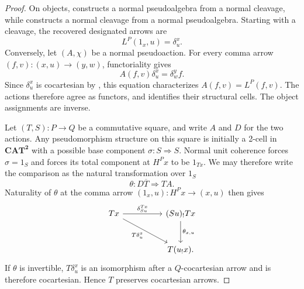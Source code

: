 \documentclass[11pt]{article}
\theoremstyle{plain}
\theoremstyle{definition}
\theoremstyle{remark}
\newcommand{\CAT}{\mathbf{CAT}}
\numberwithin{equation}{section}
\begin{document}
\begin{proof}
On objects,  constructs a normal
pseudoalgebra from a normal cleavage, while
 constructs a normal cleavage from a normal
pseudoalgebra.  Starting with a cleavage, the recovered designated
arrows are
\begin{equation*}
  L^P(1_x,u)=\delta^x_u.
\end{equation*}
Conversely, let $(A,\chi)$ be a normal pseudoaction.  For every comma
arrow $(f,v)\colon(x,u)\to(y,w)$, functoriality gives
\begin{equation*}
  A(f,v)\delta^x_u=\delta^y_wf.
\end{equation*}
Since $\delta^x_u$ is cocartesian by
, this equation characterizes
$A(f,v)=L^P(f,v)$.  The actions therefore agree as functors, and
 identifies their
structural cells.  The object assignments are inverse.

Let $(T,S)\colon P\to Q$ be a commutative square, and write $A$ and
$D$ for the two actions.  Any pseudomorphism structure on this square
is initially a 2-cell in $\CAT^{\mathbf 2}$ with a possible base
component $\sigma\colon S\Rightarrow S$.  Normal unit coherence forces
$\sigma=1_S$ and forces its total component at $H^Px$ to be
$1_{Tx}$.  We may therefore write the comparison as the natural
transformation over $1_S$
\begin{equation}
  \theta\colon D\overline T\Longrightarrow TA.
  \label{eq:C-pseudomorphism-comparison}
\end{equation}
Naturality of $\theta$ at the comma arrow
$(1_x,u)\colon H^Px\to(x,u)$ then gives
\begin{equation}
\begin{tikzcd}[column sep=huge,row sep=large]
Tx \arrow[r,"\delta^{Tx}_{Su}"]
  \arrow[dr,"T\delta^x_u"']
& (Su)_!Tx \arrow[d,"{\theta_{x,u}}"] \\
& T(u_!x).
\end{tikzcd}
\label{eq:pseudomorphism-lift-triangle}
\end{equation}
If $\theta$ is invertible, $T\delta^x_u$ is an isomorphism after a
$Q$-cocartesian arrow and is therefore cocartesian.  Hence $T$
preserves cocartesian arrows.


\end{proof}
\end{document}

